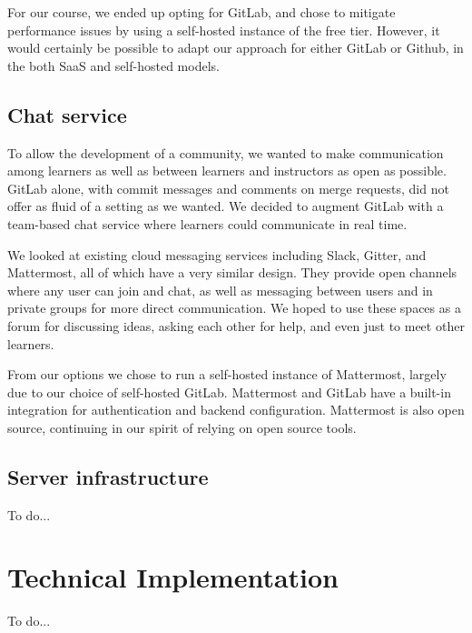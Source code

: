 \documentclass[12pt,twoside,vi]{mitthesis}
\newcommand{\wip}[1]{{\color{red} To do...}}
\begin{document}
For our course, we ended up opting for GitLab, and chose to mitigate performance issues by using a self-hosted instance of the free tier. However, it would certainly be possible to adapt our approach for either GitLab or Github, in the both SaaS and self-hosted models.

\subsection{Chat service}

To allow the development of a community, we wanted to make communication among learners as well as between learners and instructors as open as possible. GitLab alone, with commit messages and comments on merge requests, did not offer as fluid of a setting as we wanted. We decided to augment GitLab with a team-based chat service where learners could communicate in real time.

We looked at existing cloud messaging services including Slack, Gitter, and Mattermost, all of which have a very similar design. They provide open channels where any user can join and chat, as well as messaging between users and in private groups for more direct communication. We hoped to use these spaces as a forum for discussing ideas, asking each other for help, and even just to meet other learners.

From our options we chose to run a self-hosted instance of Mattermost, largely due to our choice of self-hosted GitLab. Mattermost and GitLab have a built-in integration for authentication and backend configuration. Mattermost is also open source, continuing in our spirit of relying on open source tools.

\subsection{Server infrastructure}

\wip{reliance on other software (letsencrypt, nginx, python and javascript, bash)}

\section{Technical Implementation}

\wip{In this section we outline the initial implementation of the platform. We assume a technical background, in particular familiarity with Internet architecture and Git.
6.1 Server configuration
DigitalOcean droplet https://www.digitalocean.com/community/tutorials/how-to-install-and-configure-gitlab-on-ubuntu-16-04 
GitLab [built in for DO]
NameCheap domain and networking
nginx customization
Lets encrypt
6.2 Repo architecture
Brief overview of possibilities
Step by step description of how it all worked
6.3 Scripts
As much as possible, Git-related operations of the platform were automated to ease the burden on the instructors. 
Onboarding membership request poller
Onboarding group creation
Health check with email notifications
Create subtrees
Create merge request
Merge
Analyze progress}
\end{document}
